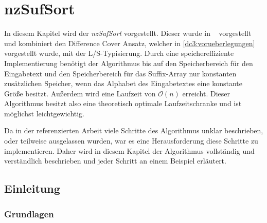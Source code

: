 \section{nzSufSort}
\label{algorithm:nzSufSort}

In  diesem Kapitel wird der \emph{nzSufSort} vorgestellt. Dieser wurde in ~\cite{saca:10} vorgestellt und kombiniert den Difference Cover Ansatz, welcher in \cref{dc3:vorueberlegungen} vorgestellt wurde, mit der L/S-Typisierung. Durch eine speichereffiziente Implementierung benötigt der Algorithmus bis auf den Speicherbereich für den Eingabetext und den Speicherbereich für das Suffix-Array nur konstanten zusätzlichen Speicher, wenn das Alphabet des Eingabetextes eine konstante Größe besitzt. Außerdem wird eine Laufzeit von $\mathcal O(n)$ erreicht. Dieser Algorithmus besitzt also eine theoretisch optimale Laufzeitschranke und ist möglichst leichtgewichtig. \par
Da in der referenzierten Arbeit viele Schritte des Algorithmus unklar beschrieben, oder teilweise ausgelassen wurden, war es eine Herausforderung diese Schritte zu implementieren. Daher wird in diesem Kapitel der Algorithmus vollständig und verständlich beschrieben und jeder Schritt an einem Beispiel erläutert. \par

\subsection{Einleitung}

\subsubsection{Grundlagen}

